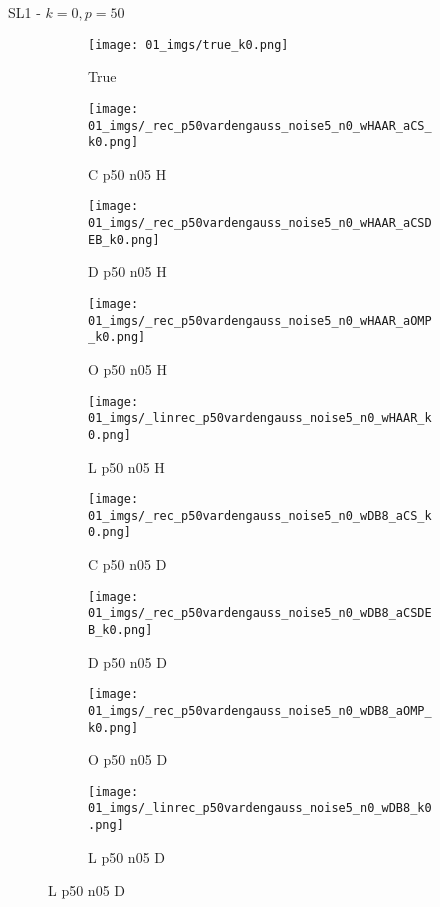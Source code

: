 \begin{frame}{SL1 - $k=0,p=50$}{}
\begin{figure}
\begin{subfigure}{0.1\textwidth}
\texttt{[image: 01\_imgs/true\_k0.png]}
\caption*{\Tiny True}
\end{subfigure}
\begin{subfigure}{0.1\textwidth}
\texttt{[image: 01\_imgs/\_rec\_p50vardengauss\_noise5\_n0\_wHAAR\_aCS\_k0.png]}
\caption*{\Tiny C p50 n05 H}
\end{subfigure}
\begin{subfigure}{0.1\textwidth}
\texttt{[image: 01\_imgs/\_rec\_p50vardengauss\_noise5\_n0\_wHAAR\_aCSDEB\_k0.png]}
\caption*{\Tiny D p50 n05 H}
\end{subfigure}
\begin{subfigure}{0.1\textwidth}
\texttt{[image: 01\_imgs/\_rec\_p50vardengauss\_noise5\_n0\_wHAAR\_aOMP\_k0.png]}
\caption*{\Tiny O p50 n05 H}
\end{subfigure}
\begin{subfigure}{0.1\textwidth}
\texttt{[image: 01\_imgs/\_linrec\_p50vardengauss\_noise5\_n0\_wHAAR\_k0.png]}
\caption*{\Tiny L p50 n05 H}
\end{subfigure}
\begin{subfigure}{0.1\textwidth}
\texttt{[image: 01\_imgs/\_rec\_p50vardengauss\_noise5\_n0\_wDB8\_aCS\_k0.png]}
\caption*{\Tiny C p50 n05 D}
\end{subfigure}
\begin{subfigure}{0.1\textwidth}
\texttt{[image: 01\_imgs/\_rec\_p50vardengauss\_noise5\_n0\_wDB8\_aCSDEB\_k0.png]}
\caption*{\Tiny D p50 n05 D}
\end{subfigure}
\begin{subfigure}{0.1\textwidth}
\texttt{[image: 01\_imgs/\_rec\_p50vardengauss\_noise5\_n0\_wDB8\_aOMP\_k0.png]}
\caption*{\Tiny O p50 n05 D}
\end{subfigure}
\begin{subfigure}{0.1\textwidth}
\texttt{[image: 01\_imgs/\_linrec\_p50vardengauss\_noise5\_n0\_wDB8\_k0.png]}
\caption*{\Tiny L p50 n05 D}
\end{subfigure}

\vspace{5pt}


\end{figure}
\end{frame}

